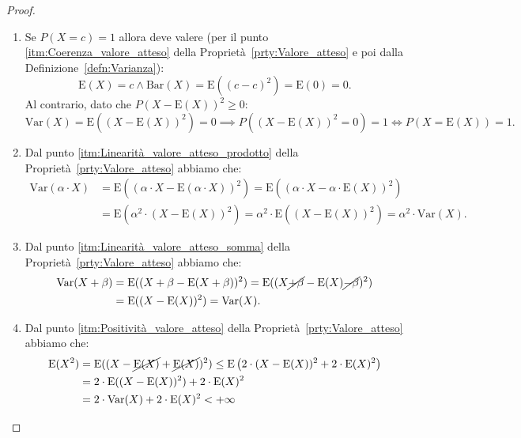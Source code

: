         \begin{proof}
            \hfill
            \begin{enumerate}
                \item Se $P(X = c) = 1$ allora deve valere (per il punto \eqref{itm:Coerenza_valore_atteso} della Proprietà~\ref{prty:Valore_atteso} e poi dalla Definizione~\ref{defn:Varianza}): \[
                    \text{E}(X) = c \land \text{Bar}(X) = \text{E}((c-c)^2) = \text{E}(0) = 0
                .\] Al contrario, dato che $P(X -\text{E}(X))^2 \geq 0$: \[
                \text{Var}(X) = \text{E}((X - \text{E}(X))^2) = 0 \implies P((X - \text{E}(X))^2 = 0) = 1 \iff P(X = \text{E}(X)) = 1
                .\]
                \item Dal punto \eqref{itm:Linearità_valore_atteso_prodotto} della Proprietà~\ref{prty:Valore_atteso} abbiamo che:
                \begin{align*}
                        \text{Var}(\alpha \cdot X) &= \text{E}((\alpha \cdot X - \text{E}(\alpha \cdot X))^2) = \text{E}((\alpha \cdot X - \alpha \cdot \text{E}(X))^2) \\
                                          &= \text{E}(\alpha^2 \cdot (X - \text{E}(X))^2) = \alpha^2 \cdot \text{E}((X - \text{E}(X))^2)= \alpha^2 \cdot \text{Var}(X)
                .\end{align*}
                \item Dal punto \eqref{itm:Linearità_valore_atteso_somma} della Proprietà~\ref{prty:Valore_atteso} abbiamo che:
                \begin{align*}
                    \text{Var}(X + \beta) &= \text{E}((X+\beta -\text{E}(X+\beta))^2) = \text{E}((X \cancel{+\beta} -\text{E}(X) \cancel{-\beta})^2) \\
                                          &= \text{E}((X - \text{E}(X))^2) = \text{Var}(X)
                .\end{align*}
                \item Dal punto \eqref{itm:Positività_valore_atteso} della Proprietà~\ref{prty:Valore_atteso} abbiamo che:
                \begin{align*}
                    \text{E}(X^2) &= \text{E}((X - \cancel{\text{E}(X)} + \cancel{\text{E}(X)})^2) \leq \text{E}\left(2\cdot(X - \text{E}(X))^2 + 2\cdot\text{E}(X)^2\right) \\
                                  &= 2 \cdot \text{E}((X - \text{E}(X))^2) + 2\cdot\text{E}(X)^2 \\
                                  &= 2\cdot\text{Var}(X) + 2\cdot\text{E}(X)^2 < +\infty

\end{align*}
\end{enumerate}
\end{proof}
